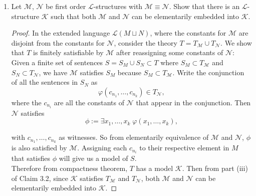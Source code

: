 \documentclass{article}
\begin{document}
\begin{enumerate}
\begin{proof}
      Then $\neg\varphi_{\text{inf}}\wedge\varphi_F$ will axiomatize the
      finite fields. For each $n\in\mathbb{N}^+$, consider the sentence
      $\varphi_n$ which says ``I have at least $n$ distinct elements'',
      defined by
      \begin{align*}
        \varphi_n := \exists x_1,\ldots,x_n\; \bigwedge_{1\leq i<j\leq n}
        \neg x_i=x_j.
      \end{align*}
      Then because arbitrarily large finite fields exist (take
      $\mathbb{F}_p$ for large enough primes $p$),
      $\{\neg\varphi_{\text{inf}}\wedge\varphi_F\}\cup_{n\in\mathbb{N}^+}\varphi_n$
      is finitely satisfiable, and by compactness should be satisfiable by
      a field. However such a field is both finite and infinite, a
      contradiction.
    \end{proof}

  \item Let $\mathcal{M}$, $\mathcal{N}$ be first order
    $\mathcal{L}$-structures with $\mathcal{M}\equiv\mathcal{N}$. Show that
    there is an $\mathcal{L}$-structure $\mathcal{K}$ such that both
    $\mathcal{M}$ and $\mathcal{N}$ can be elementarily embedded into
    $\mathcal{K}$. 

    \begin{proof}
      In the extended language $\mathcal{L}(M\sqcup N)$, where the constants
      for $\mathcal{M}$ are disjoint from the constants for $\mathcal{N}$,
      consider the theory $T=T_\mathcal{M}\cup T_\mathcal{N}$. We show that
      $T$ is finitely satisfiable by $\mathcal{M}$ after reassigning some
      constants of $\mathcal{N}$: Given a finite set of sentences
      $S=S_M\cup S_N\subset T$ where $S_M\subset T_\mathcal{M}$ and
      $S_N\subset T_\mathcal{N}$, we have $\mathcal{M}$ satisfies $S_M$
      because $S_M\subset T_\mathcal{M}$. Write the conjunction of all the
      sentences in $S_N$ as
      \begin{equation*}
        \varphi(c_{n_1},\ldots,c_{n_k})\in T_\mathcal{N},
      \end{equation*}
      where the $c_{n_i}$ are all the constants of $\mathcal{N}$ that appear in
      the conjunction. Then $\mathcal{N}$ satisfies
      \begin{equation*}
        \phi := \exists x_1,\ldots,x_k\; \varphi(x_1,\ldots,x_k),
      \end{equation*}

      with $c_{n_1},\ldots,c_{n_k}$ as witnesses. So from elementarily
      equivalence of $\mathcal{M}$ and $\mathcal{N}$, $\phi$ is also
      satisfied by $\mathcal{M}$. Assigning each $c_{n_i}$ to their respective
      element in $M$ that satisfies $\phi$ will give us a model of $S$. \\

      Therefore from compactness theorem, $T$ has a model $\mathcal{K}$. Then
      from part (iii) of Claim 3.2, since $\mathcal{K}$ satisfies
      $T_\mathcal{M}$ and $T_\mathcal{N}$, both $\mathcal{M}$ and
      $\mathcal{N}$ can be elementarily embedded into $\mathcal{K}$.
    \end{proof}
\end{enumerate}
\end{document}
